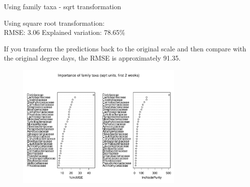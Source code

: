 \documentclass{beamer}
\begin{document}
\begin{frame}{Using family taxa - sqrt transformation}

  {\scriptsize
    
  \noindent Using square root transformation:\\
  RMSE: 3.06  \hspace{0.05in}  Explained variation: 78.65\%

  \vspace{0.05in}
  
  \noindent If you transform the predictions back to the original
  scale and then compare with the original degree days, the RMSE is
  approximately 91.35.
  
\begin{center}
\begin{figure}
  \includegraphics[width=3.25in]{../only_families/first_two_weeks/sqrt_units_first_two_weeks_families_imp_plot}
\end{figure}
\end{center}
\vspace{-0.25in}
}
  
\end{frame}
\end{document}
